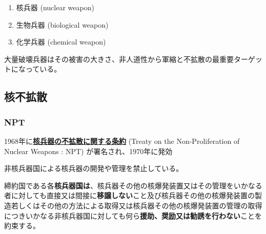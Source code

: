 \documentclass[
  xelatex,
  ja=standard]{bxjsarticle}
\providecommand{\tightlist}{%
  \setlength{\itemsep}{0pt}\setlength{\parskip}{0pt}}\usepackage{longtable,booktabs,array}
\begin{document}
\begin{enumerate}
\def\labelenumi{\arabic{enumi}.}
\tightlist
\item
  核兵器 (nuclear weapon)
\item
  生物兵器 (biological weapon)
\item
  化学兵器 (chemical weapon)
\end{enumerate}

大量破壊兵器はその被害の大きさ、非人道性から軍縮と不拡散の最重要ターゲットになっている。

\hypertarget{ux6838ux4e0dux62e1ux6563}{%
\subsection{核不拡散}\label{ux6838ux4e0dux62e1ux6563}}

\hypertarget{npt}{%
\subsubsection{NPT}\label{npt}}

1968年に\href{https://www.mofa.go.jp/mofaj/gaiko/treaty/pdfs/B-S51-0403.pdf}{\textbf{核兵器の不拡散に関する条約}}
(Treaty on the Non-Proliferation of Nuclear Weapons : NPT)
が署名され、1970年に発効

非核兵器国による核兵器の開発や管理を禁止している。

\begin{tcolorbox}[enhanced jigsaw, left=2mm, toprule=.15mm, opacityback=0, colframe=quarto-callout-note-color-frame, opacitybacktitle=0.6, breakable, coltitle=black, colbacktitle=quarto-callout-note-color!10!white, colback=white, bottomtitle=1mm, toptitle=1mm, titlerule=0mm, title=\textcolor{quarto-callout-note-color}{\faInfo}\hspace{0.5em}{\href{https://www1.doshisha.ac.jp/~karai/intlaw/docs/npt.htm}{核兵器不拡散条約}　第1条}, arc=.35mm, rightrule=.15mm, bottomrule=.15mm, leftrule=.75mm]

締約国である各\textbf{核兵器国は}、核兵器その他の核爆発装置又はその管理をいかなる者に対しても直接又は間接に\textbf{移譲しない}こと及び核兵器その他の核爆発装置の製造若しくはその他の方法による取得又は核兵器その他の核爆発装置の管理の取得につきいかなる非核兵器国に対しても何ら\textbf{援助、奨励又は勧誘を行わない}ことを約束する。

\end{tcolorbox}
\end{document}
